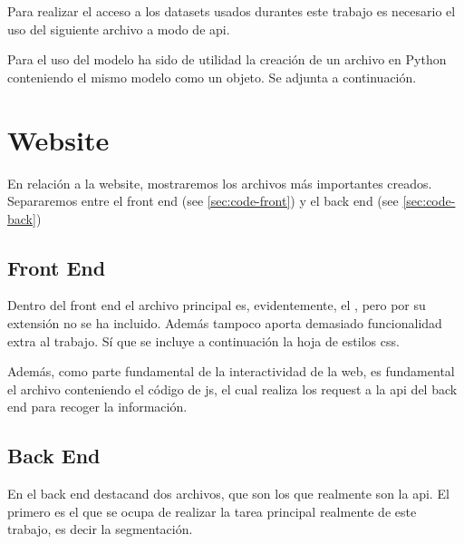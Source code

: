 
Para realizar el acceso a los datasets usados durantes este trabajo es
necesario el uso del siguiente archivo a modo de \gls{api}.


Para el uso del modelo ha sido de utilidad la creación de un archivo en Python
conteniendo el mismo modelo como un objeto. Se adjunta a continuación.




\section{Website}\label{sec:code-web}

En relación a la website, mostraremos los archivos más importantes
creados. Separaremos entre el front end (see \vref{sec:code-front}) y el back
end (see \vref{sec:code-back})

\subsection{Front End}\label{sec:code-front}

Dentro del front end el archivo principal es, evidentemente, el
, pero por su extensión no se ha incluido. Además tampoco
aporta demasiado funcionalidad extra al trabajo. Sí que se incluye a
continuación la hoja de estilos \acs{css}.


Además, como parte fundamental de la interactividad de la web, es fundamental
el archivo conteniendo el código de \acs{js}, el cual realiza los request a la
\gls{api} del back end para recoger la información.



\subsection{Back End}\label{sec:code-back}

En el back end destacand dos archivos, que son los que realmente son la
\gls{api}. El primero es el que se ocupa de realizar la tarea principal
realmente de este trabajo, es decir la segmentación.


